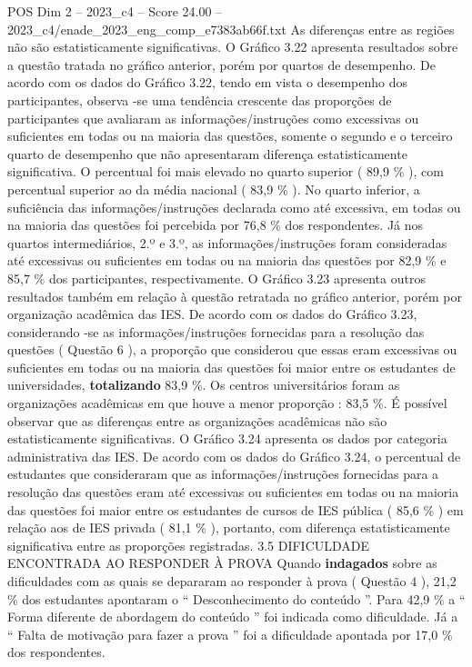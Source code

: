 \begin{textsample}{POS Dim 2 – 2023\_c4 – Score 24.00 – 2023\_c4/enade\_2023\_eng\_comp\_e7383ab66f.txt}
As diferenças entre as regiões não são estatisticamente significativas.
O Gráfico 3.22 apresenta resultados sobre a questão tratada no gráfico anterior, porém por quartos de desempenho.
De acordo com os dados do Gráfico 3.22, tendo em vista o desempenho dos participantes, observa -se uma tendência crescente das proporções de participantes que avaliaram as informações/instruções como excessivas ou suficientes em todas ou na maioria das questões, somente o segundo e o terceiro quarto de desempenho que não apresentaram diferença estatisticamente significativa.
O percentual foi mais elevado no quarto superior ( 89,9 \% ), com percentual superior ao da média nacional ( 83,9 \% ).
No quarto inferior, a suficiência das informações/instruções declarada como até excessiva, em todas ou na maioria das questões foi percebida por 76,8 \% dos respondentes.
Já nos quartos intermediários, 2.º e 3.º, as informações/instruções foram consideradas até excessivas ou suficientes em todas ou na maioria das questões por 82,9 \% e 85,7 \% dos participantes, respectivamente.
O Gráfico 3.23 apresenta outros resultados também em relação à questão retratada no gráfico anterior, porém por organização acadêmica das IES.
De acordo com os dados do Gráfico 3.23, considerando -se as informações/instruções fornecidas para a resolução das questões ( Questão 6 ), a proporção que considerou que essas eram excessivas ou suficientes em todas ou na maioria das questões foi maior entre os estudantes de universidades, \textbf{totalizando} 83,9 \%.
Os centros universitários foram as organizações acadêmicas em que houve a menor proporção : 83,5 \%.
É possível observar que as diferenças entre as organizações acadêmicas não são estatisticamente significativas.
O Gráfico 3.24 apresenta os dados por categoria administrativa das IES.
De acordo com os dados do Gráfico 3.24, o percentual de estudantes que consideraram que as informações/instruções fornecidas para a resolução das questões eram até excessivas ou suficientes em todas ou na maioria das questões foi maior entre os estudantes de cursos de IES pública ( 85,6 \% ) em relação aos de IES privada ( 81,1 \% ), portanto, com diferença estatisticamente significativa entre as proporções registradas. 3.5 DIFICULDADE ENCONTRADA AO RESPONDER À PROVA Quando \textbf{indagados} sobre as dificuldades com as quais se depararam ao responder à prova ( Questão 4 ), 21,2 \% dos estudantes apontaram o “ Desconhecimento do conteúdo ”.
Para 42,9 \% a “ Forma diferente de abordagem do conteúdo ” foi indicada como dificuldade.
Já a “ Falta de motivação para fazer a prova ” foi a dificuldade apontada por 17,0 \% dos respondentes.

\end{textsample}
